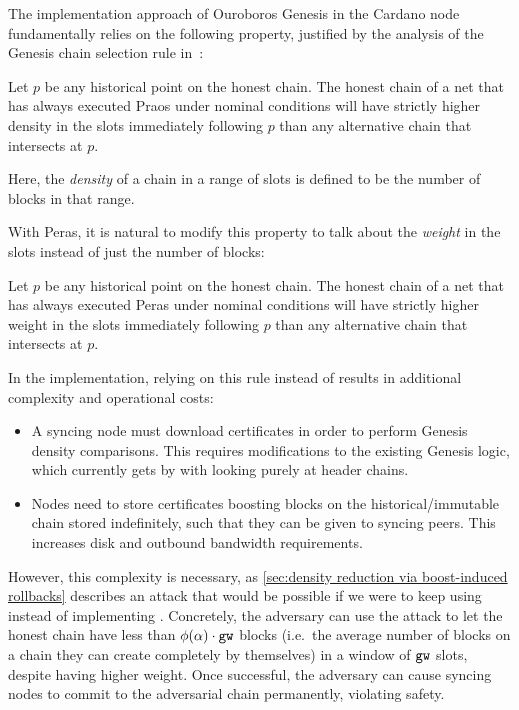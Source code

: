 The implementation approach of Ouroboros Genesis in the Cardano node fundamentally relies on the following property, justified by the analysis of the Genesis chain selection rule in~\cite{badertscher2018ouroboros}:
\begin{tcolorbox}[title=\densityOfCompetingChainsName]\label{property:density-of-competing-chains}
  Let $p$ be any historical point on the honest chain. The honest chain of a net that has always executed Praos under nominal conditions will have strictly higher density in the \sgen{} slots immediately following $p$ than any alternative chain that intersects at $p$.
\end{tcolorbox}
Here, the \emph{density} of a chain in a range of slots is defined to be the number of blocks in that range.

\medskip
With Peras, it is natural to modify this property to talk about the \emph{weight} in the \sgen{} slots instead of just the number of blocks:
\begin{tcolorbox}[title=\weightedDensityOfCompetingChainsName]\label{property:weighted-density-of-competing-chains}
  Let $p$ be any historical point on the honest chain. The honest chain of a net that has always executed Peras under nominal conditions will have strictly higher weight in the \sgen{} slots immediately following $p$ than any alternative chain that intersects at $p$.
\end{tcolorbox}
In the implementation, relying on this rule instead of \densityOfCompetingChains{} results in additional complexity and operational costs:
\begin{itemize}
\item A syncing node must download certificates in order to perform Genesis density comparisons.
  This requires modifications to the existing Genesis logic, which currently gets by with looking purely at header chains.
\item Nodes need to store certificates boosting blocks on the historical/immutable chain stored indefinitely, such that they can be given to syncing peers.
  This increases disk and outbound bandwidth requirements.
\end{itemize}
However, this complexity is necessary, as \cref{sec:density reduction via boost-induced rollbacks} describes an attack that would be possible if we were to keep using \densityOfCompetingChains{} instead of implementing \weightedDensityOfCompetingChains{}.
Concretely, the adversary can use the attack to let the honest chain have less than $\phi(\alpha) \cdot \mathtt{gw}$ blocks (i.e.\ the average number of blocks on a chain they can create completely by themselves) in a window of $\mathtt{gw}$ slots, despite having higher weight.
Once successful, the adversary can cause syncing nodes to commit to the adversarial chain permanently, violating safety.

